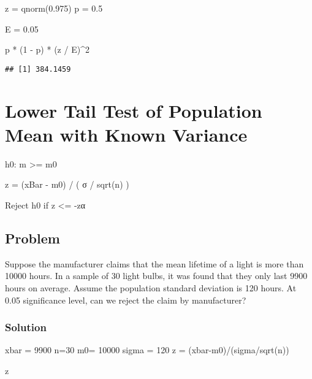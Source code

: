 \documentclass[
]{article}
\newenvironment{Shaded}{\begin{snugshade}}{\end{snugshade}}
\newcommand{\DecValTok}[1]{\textcolor[rgb]{0.00,0.00,0.81}{#1}}
\newcommand{\FloatTok}[1]{\textcolor[rgb]{0.00,0.00,0.81}{#1}}
\newcommand{\FunctionTok}[1]{\textcolor[rgb]{0.00,0.00,0.00}{#1}}
\newcommand{\NormalTok}[1]{#1}
\newcommand{\OtherTok}[1]{\textcolor[rgb]{0.56,0.35,0.01}{#1}}
\newcommand{\SpecialCharTok}[1]{\textcolor[rgb]{0.00,0.00,0.00}{#1}}
\begin{document}
\begin{Shaded}
\begin{Highlighting}[]
\NormalTok{z }\OtherTok{=} \FunctionTok{qnorm}\NormalTok{(}\FloatTok{0.975}\NormalTok{)}
\NormalTok{p }\OtherTok{=} \FloatTok{0.5}

\NormalTok{E }\OtherTok{=} \FloatTok{0.05}

\NormalTok{p }\SpecialCharTok{*}\NormalTok{ (}\DecValTok{1} \SpecialCharTok{{-}}\NormalTok{ p) }\SpecialCharTok{*}\NormalTok{ (z }\SpecialCharTok{/}\NormalTok{ E)}\SpecialCharTok{\^{}}\DecValTok{2}
\end{Highlighting}
\end{Shaded}

\begin{verbatim}
## [1] 384.1459
\end{verbatim}

\hypertarget{lower-tail-test-of-population-mean-with-known-variance}{%
\section{Lower Tail Test of Population Mean with Known
Variance}\label{lower-tail-test-of-population-mean-with-known-variance}}

h0: m \textgreater= m0

z = (xBar - m0) / ( σ / sqrt(n) )

Reject h0 if z \textless= -zα

\hypertarget{problem-10}{%
\subsection{Problem}\label{problem-10}}

Suppose the manufacturer claims that the mean lifetime of a light is
more than 10000 hours. In a sample of 30 light bulbs, it was found that
they only last 9900 hours on average. Assume the population standard
deviation is 120 hours. At 0.05 significance level, can we reject the
claim by manufacturer?

\hypertarget{solution-12}{%
\subsubsection{Solution}\label{solution-12}}

\begin{Shaded}
\begin{Highlighting}[]
\NormalTok{xbar }\OtherTok{=} \DecValTok{9900}
\NormalTok{n}\OtherTok{=}\DecValTok{30}
\NormalTok{m0}\OtherTok{=} \DecValTok{10000}  
\NormalTok{sigma }\OtherTok{=} \DecValTok{120}
\NormalTok{z }\OtherTok{=}\NormalTok{ (xbar}\SpecialCharTok{{-}}\NormalTok{m0)}\SpecialCharTok{/}\NormalTok{(sigma}\SpecialCharTok{/}\FunctionTok{sqrt}\NormalTok{(n))}

\NormalTok{z}
\end{Highlighting}
\end{Shaded}
\end{document}
